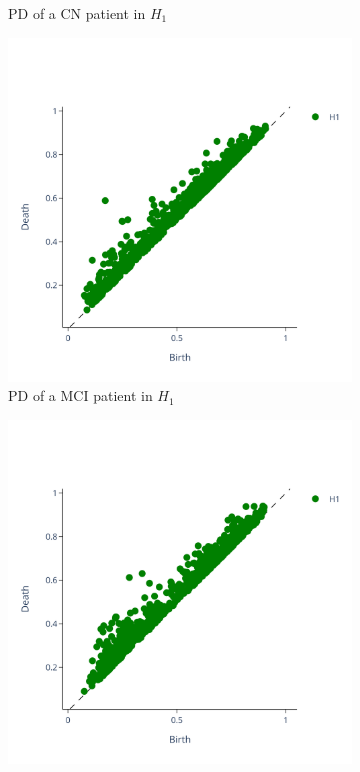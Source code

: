 \documentclass{article}
\begin{document}
\begin{figure}
\begin{subfigure}{0.32\textwidth}
    \caption{PD of a CN patient in $H_1$}
  \end{subfigure}
  \begin{subfigure}{0.32\textwidth}
    \includegraphics[width=\textwidth]{figures/PDs/persistence_diagram_MCI_H_1.png}
    \caption{PD of a MCI patient in $H_1$}
  \end{subfigure}
  \begin{subfigure}{0.32\textwidth}
    \includegraphics[width=\textwidth]{figures/PDs/persistence_diagram_AD_H_1.png}

\end{subfigure}
\end{figure}
\end{document}
